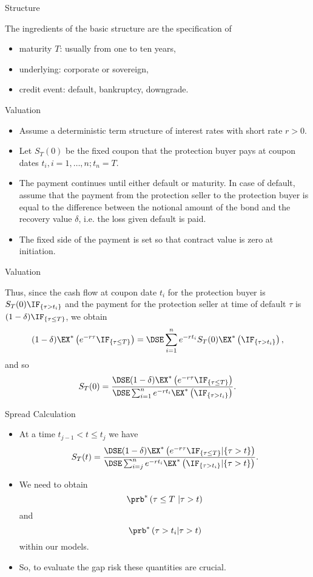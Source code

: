 {Structure}

The ingredients of the basic structure are the specification of
\begin{itemize}
\item<1-> maturity $T$: usually from one to ten years,
\item<2->
underlying: corporate or sovereign, \item<3-> credit event:
default, bankruptcy, downgrade.
\end{itemize}



{Valuation}

\begin{itemize}
\item<1-> Assume a deterministic term structure of interest rates with short rate $r>0$.
\item<2->Let $S_T(0)$ be the fixed coupon that the protection buyer pays at coupon dates
$t_i, i=1,\ldots, n; t_n=T$.
\item<3->The
payment continues until either default or maturity. In case of
default, assume that the payment from the protection seller to the
protection buyer is equal to the difference between the notional
amount of the bond and the recovery value $\delta$, i.e. the loss given default is paid.
\item<4->The fixed side
of the payment is set so that contract value is zero at
initiation.
\end{itemize}


{Valuation}

Thus, since the cash flow at coupon date $t_i$ for the protection
buyer is $S_T(0)\IF_{\{\tau>t_i\}}$ and the payment for the protection
seller at time of default $\tau$ is $(1-\delta)\IF_{\{\tau\leq
T\}}$, we obtain
$$
(1-\delta)\EX^*\left(e^{-r\tau}\IF_{\{\tau\leq
T\}}\right) = \DSE\sum_{i=1}^n e^{-rt_i} S_T(0)\EX^*\left(\IF_{\{\tau
>t_i\}}\right),
$$
and so
$$
S_T(0)=\frac{\DSE (1-\delta)\EX^*\left(e^{-r\tau}\IF_{\{\tau\leq
T\}}\right)} {\DSE\sum_{i=1}^n e^{-rt_i} \EX^*\left(\IF_{\{\tau
>t_i\}}\right)}.
$$



{Spread Calculation}

\begin{itemize}
\item<1-> At a time $t_{j-1} < t \leq t_j$ we have
$$
S_T(t)=\frac{\DSE (1-\delta)\EX^*\left(e^{-r\tau}\IF_{\{\tau\leq
T\} }  | \{\tau >t\}\right)} {\DSE\sum_{i=j}^n e^{-rt_i} \EX^*\left(\IF_{\{\tau
>t_i\}}| \{\tau >t\}\right)}.
$$

\item<1-> We need to obtain
$$\prb^*\left(\tau\leq T\ | \tau >t \right)$$ and
$$\prb^*\left(\tau >t_i | \tau >t\right)$$ within our models.
\item<2-> So, to evaluate the gap risk these quantities are crucial.  \end{itemize}



